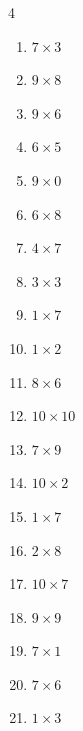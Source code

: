 \begin{multicols}{4}
\begin{enumerate}
  \item $7\times 3$
        \phantom{$=21$}

  \item $9\times 8$
        \phantom{$=72$}

  \item $9\times 6$
        \phantom{$=54$}

  \item $6\times 5$
        \phantom{$=30$}

  \item $9\times 0$
        \phantom{$=0$}

  \item $6\times 8$
        \phantom{$=48$}

  \item $4\times 7$
        \phantom{$=28$}

  \item $3\times 3$
        \phantom{$=9$}

  \item $1\times 7$
        \phantom{$=7$}

  \item $1\times 2$
        \phantom{$=2$}

  \item $8\times 6$
        \phantom{$=48$}

  \item $10\times 10$
        \phantom{$=100$}

  \item $7\times 9$
        \phantom{$=63$}

  \item $10\times 2$
        \phantom{$=20$}

  \item $1\times 7$
        \phantom{$=7$}

  \item $2\times 8$
        \phantom{$=16$}

\columnbreak %

  \item $10\times 7$
        \phantom{$=70$}

  \item $9\times 9$
        \phantom{$=81$}

  \item $7\times 1$
        \phantom{$=7$}

  \item $7\times 6$
        \phantom{$=42$}

  \item $1\times 3$
        \phantom{$=3$}


\end{enumerate}
\end{multicols}
